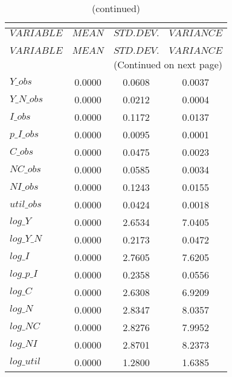  
\begin{center}
\begin{longtable}{lccc} 
\caption{THEORETICAL MOMENTS}\\
 \label{Table:th_moments}\\
\toprule 
$VARIABLE   $	 & 	 $         MEAN$	 & 	 $    STD. DEV.$	 & 	 $     VARIANCE$\\
\midrule \endfirsthead 
\caption{(continued)}\\
 \toprule \\ 
$VARIABLE   $	 & 	 $         MEAN$	 & 	 $    STD. DEV.$	 & 	 $     VARIANCE$\\
\midrule \endhead 
\midrule \multicolumn{4}{r}{(Continued on next page)} \\ \bottomrule \endfoot 
\bottomrule \endlastfoot 
$Y\_obs     $	 & 	       0.0000	 & 	       0.0608	 & 	       0.0037 \\ 
$Y\_N\_obs  $	 & 	       0.0000	 & 	       0.0212	 & 	       0.0004 \\ 
$I\_obs     $	 & 	       0.0000	 & 	       0.1172	 & 	       0.0137 \\ 
$p\_I\_obs  $	 & 	       0.0000	 & 	       0.0095	 & 	       0.0001 \\ 
$C\_obs     $	 & 	       0.0000	 & 	       0.0475	 & 	       0.0023 \\ 
$NC\_obs    $	 & 	       0.0000	 & 	       0.0585	 & 	       0.0034 \\ 
$NI\_obs    $	 & 	       0.0000	 & 	       0.1243	 & 	       0.0155 \\ 
$util\_obs  $	 & 	       0.0000	 & 	       0.0424	 & 	       0.0018 \\ 
$log\_Y     $	 & 	       0.0000	 & 	       2.6534	 & 	       7.0405 \\ 
$log\_Y\_N  $	 & 	       0.0000	 & 	       0.2173	 & 	       0.0472 \\ 
$log\_I     $	 & 	       0.0000	 & 	       2.7605	 & 	       7.6205 \\ 
$log\_p\_I  $	 & 	       0.0000	 & 	       0.2358	 & 	       0.0556 \\ 
$log\_C     $	 & 	       0.0000	 & 	       2.6308	 & 	       6.9209 \\ 
$log\_N     $	 & 	       0.0000	 & 	       2.8347	 & 	       8.0357 \\ 
$log\_NC    $	 & 	       0.0000	 & 	       2.8276	 & 	       7.9952 \\ 
$log\_NI    $	 & 	       0.0000	 & 	       2.8701	 & 	       8.2373 \\ 
$log\_util  $	 & 	       0.0000	 & 	       1.2800	 & 	       1.6385 \\ 
\end{longtable}
 \end{center}
